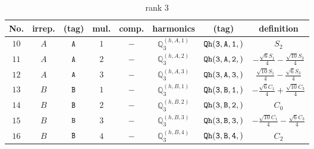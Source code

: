 \documentclass[fleqn,8pt]{jsarticle}
\begin{document}
\begin{table}[ht!]
\begin{center}
\caption{rank 3}
\renewcommand{\arraystretch}{1.3}
\begin{tabular}{cccccccc} \hline \hline
No. & irrep. & (tag) & mul. & comp. & harmonics & (tag) & definition \\ \hline
$ 10 $ & $ A $ & $ {\tt A} $ & $ 1 $ & $ - $ & $ \mathbb{Q}_{3}^{(h,A,1)} $ & $ {\tt Qh(3,A,1,)} $ & $ S_{2} $ \\
$ 11 $ & $ A $ & $ {\tt A} $ & $ 2 $ & $ - $ & $ \mathbb{Q}_{3}^{(h,A,2)} $ & $ {\tt Qh(3,A,2,)} $ & $ - \frac{\sqrt{6} S_{1}}{4} - \frac{\sqrt{10} S_{3}}{4} $ \\
$ 12 $ & $ A $ & $ {\tt A} $ & $ 3 $ & $ - $ & $ \mathbb{Q}_{3}^{(h,A,3)} $ & $ {\tt Qh(3,A,3,)} $ & $ \frac{\sqrt{10} S_{1}}{4} - \frac{\sqrt{6} S_{3}}{4} $ \\
$ 13 $ & $ B $ & $ {\tt B} $ & $ 1 $ & $ - $ & $ \mathbb{Q}_{3}^{(h,B,1)} $ & $ {\tt Qh(3,B,1,)} $ & $ - \frac{\sqrt{6} C_{1}}{4} + \frac{\sqrt{10} C_{3}}{4} $ \\
$ 14 $ & $ B $ & $ {\tt B} $ & $ 2 $ & $ - $ & $ \mathbb{Q}_{3}^{(h,B,2)} $ & $ {\tt Qh(3,B,2,)} $ & $ C_{0} $ \\
$ 15 $ & $ B $ & $ {\tt B} $ & $ 3 $ & $ - $ & $ \mathbb{Q}_{3}^{(h,B,3)} $ & $ {\tt Qh(3,B,3,)} $ & $ - \frac{\sqrt{10} C_{1}}{4} - \frac{\sqrt{6} C_{3}}{4} $ \\
$ 16 $ & $ B $ & $ {\tt B} $ & $ 4 $ & $ - $ & $ \mathbb{Q}_{3}^{(h,B,4)} $ & $ {\tt Qh(3,B,4,)} $ & $ C_{2} $ \\
 \hline \hline
\end{tabular}
\end{center}
\end{table}
\end{document}

